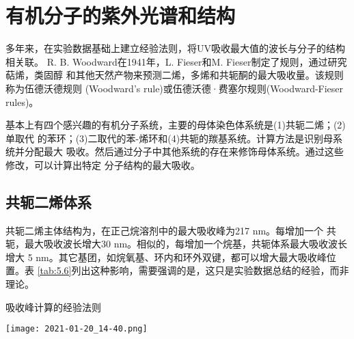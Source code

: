 \section{有机分子的紫外光谱和结构}
多年来，在实验数据基础上建立经验法则，将UV吸收最大值的波长与分子的结构相关联。
R. B. Woodward在1941年，L. Fieser和M. Fieser制定了规则，通过研究萜烯，类固醇
和其他天然产物来预测二烯，多烯和共轭酮的最大吸收量。该规则称为伍德沃德规则
(Woodward's rule)或伍德沃德·费塞尔规则(Woodward-Fieser rules)。

基本上有四个感兴趣的有机分子系统，主要的母体染色体系统是(1)共轭二烯；(2)单取代
的苯环；(3)二取代的苯-烯环和(4)共轭的羰基系统。计算方法是识别母系统并分配最大
吸收。然后通过分子中其他系统的存在来修饰母体系统。通过这些修改，可以计算出特定
分子结构的最大吸收。
\subsection{共轭二烯体系}
共轭二烯主体结构为，在正己烷溶剂中的最大吸收峰为217 nm。每增加一个
共轭，最大吸收波长增大30 nm。相似的，每增加一个烷基，共轭体系最大吸收波长增大
5 nm。其它基团，如烷氧基、环内和环外双键，都可以增大最大吸收峰位置。表
\ref{tab:5.6}列出这种影响，需要强调的是，这只是实验数据总结的经验，而非理论。
\begin{table}[htbp]
    \centering
    \caption{吸收峰计算的经验法则}
    \label{tab:5.6}
    \texttt{[image: 2021-01-20\_14-40.png]}
\end{table}

